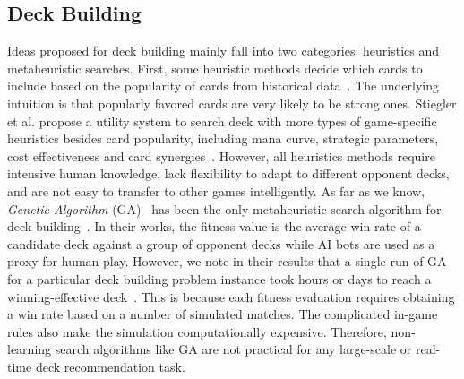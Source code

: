 \subsection{Deck Building}

Ideas proposed for deck building mainly fall into two categories: heuristics and metaheuristic searches. First, some heuristic methods decide which cards to include based on the popularity of cards from  historical data~\cite{frankkarsten,willfancher}. The underlying intuition is that popularly favored cards are very likely to be strong ones. Stiegler et al. propose a utility system to search deck with more types of game-specific heuristics besides card popularity, including mana curve, strategic parameters, cost effectiveness and card synergies~\cite{stiegler2016hearthstone}. However, all heuristics methods require intensive human knowledge, lack  flexibility to adapt to different opponent decks, and are not easy to transfer to other games intelligently. As far as we know, \textit{Genetic Algorithm} (GA)~\cite{holland1992adaptation} has been the only metaheuristic search algorithm for deck building~\cite{garcia2016evolutionary,bjorke2017deckbuilding}. In their works, the fitness value is the average win rate of a candidate deck against a group of opponent decks while AI bots are used as a proxy for human play. However, we note in their results that a single run of GA for a particular deck building problem instance took hours or days to reach a winning-effective deck~\cite{garcia2016evolutionary,bjorke2017deckbuilding}. This is because each fitness evaluation requires obtaining a win rate based on a number of simulated matches. The complicated in-game rules also make the simulation computationally expensive. Therefore, non-learning search algorithms like GA are not practical for any large-scale or real-time deck recommendation task.




